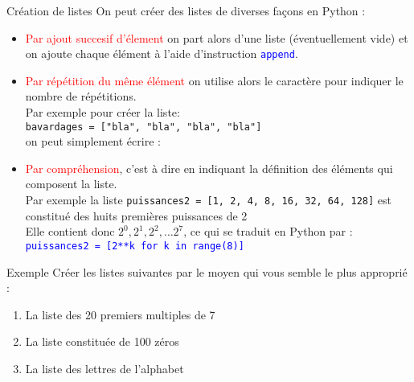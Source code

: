 \documentclass[10pt]{beamer}
\begin{document}
\begin{frame}
	\mframe{\Python}
	\begin{alertblock}{Création de listes}
		On peut créer des listes de diverses façons en Python :
		\begin{itemize}[label=\textbullet]
			\item<2-> \textcolor{red}{Par ajout succesif d'élement} on part alors d'une liste (éventuellement vide) et on ajoute chaque élément à l'aide d'instruction \textcolor{blue}{\tt append}.
			\item<3-> \textcolor{red}{Par répétition du même élément} on utilise alors le caractère \textcolor{blue}{\tt *} pour indiquer le nombre de répétitions. \\
			      \onslide<4-> {Par exemple pour créer la liste: \\ {\tt bavardages = ["bla", "bla", "bla", "bla"]} \\ on peut simplement écrire : \\}
			      \onslide<5->{\textcolor{blue}{\tt bavardages = ["bla"]*4}}
			\item<6->	 \textcolor{red}{Par compréhension}, c'est à dire en indiquant la définition des éléments qui composent la liste. \\
			      \onslide<7-> {Par exemple la liste {\tt puissances2 = [1, 2, 4, 8, 16, 32, 64, 128]} est constitué des huits premières puissances de 2} \\
			      \onslide<8-> {Elle contient donc $2^0, 2^1, 2^2, \dots 2^7$, ce qui se traduit en Python par :}\\
			      \onslide<9-> \textcolor{blue}{\tt puissances2 = [2**k for k in range(8)]}
		\end{itemize}
	\end{alertblock}
\end{frame}

\begin{frame}
	\mframe{\Python}
	\begin{exampleblock}{Exemple}
		Créer les listes suivantes par le moyen qui vous semble le plus approprié :
		\begin{enumerate}[label=\textbullet]
			\item<1-> La liste des 20 premiers multiples de 7
			\item<2-> La liste constituée de 100 zéros
			\item<3-> La liste des lettres de l'alphabet
		\end{enumerate}
	\end{exampleblock}
\end{frame}
\end{document}
